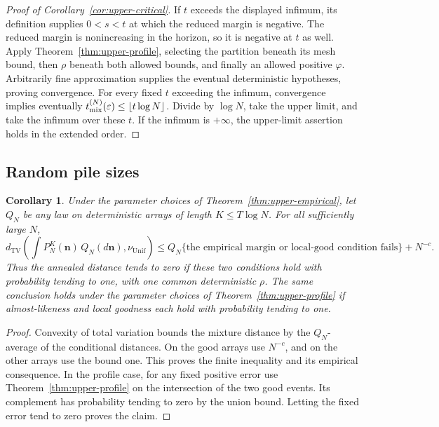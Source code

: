 \documentclass[11pt]{article}
\numberwithin{equation}{section}
\newtheorem{corollary}[theorem]{Corollary}
\theoremstyle{definition}
\theoremstyle{remark}
\newcommand{\TV}{\mathrm{TV}}
\newcommand{\Unif}{\mathrm{Unif}}
\newcommand{\dTV}{d_{\TV}}
\newcommand{\nuUnif}{\nu_{\Unif}}
\newcommand{\1}{\mathbf 1}
\begin{document}

\begin{proof}[Proof of Corollary~\ref{cor:upper-critical}]
If $t$ exceeds the displayed infimum, its definition supplies $0<s<t$ at which
the reduced margin is negative. The reduced margin is nonincreasing
in the horizon, so it is negative at $t$ as well. Apply
Theorem~\ref{thm:upper-profile}, selecting the partition beneath its
mesh bound, then $\rho$ beneath both allowed bounds, and finally an
allowed positive $\varphi$. Arbitrarily fine approximation supplies
the eventual deterministic hypotheses, proving convergence.
For every fixed $t$ exceeding the infimum, convergence implies eventually
$t_{\rm mix}^{(N)}(\varepsilon)\le\lfloor t\log N\rfloor$.
Divide by $\log N$, take the upper limit, and take the infimum over
these $t$. If the infimum is $+\infty$, the upper-limit assertion
holds in the extended order.
\end{proof}

\subsection{Random pile sizes}
\begin{corollary}%
\label{cor:upper-random}
Under the parameter choices of Theorem~\ref{thm:upper-empirical}, let
$Q_N$ be any law on deterministic arrays of length $K\le T\log N$.
For all sufficiently large $N$,
\[
 \dTV\left(\int P_N^K(\mathbf n)\,Q_N(d\mathbf n),
                         \nuUnif\right)
 \le Q_N\{\text{the empirical margin or local-good condition fails}\}
                        +N^{-c}.
\]
Thus the annealed distance tends to zero if these two conditions hold
with probability tending to one, with one common deterministic $\rho$.
The same conclusion holds under the parameter choices of
Theorem~\ref{thm:upper-profile} if almost-likeness and local goodness
each hold with probability tending to one.
\end{corollary}
\begin{proof}
Convexity of total variation bounds the mixture distance by the
$Q_N$-average of the conditional distances. On the good arrays use
$N^{-c}$, and on the other arrays use the bound one. This proves the
finite inequality and its empirical consequence. In the profile
case, for any fixed positive error use
Theorem~\ref{thm:upper-profile} on the intersection of the two good
events. Its complement has probability tending to zero by the union
bound. Letting the fixed error tend to zero proves the claim.
\end{proof}
\end{document}

